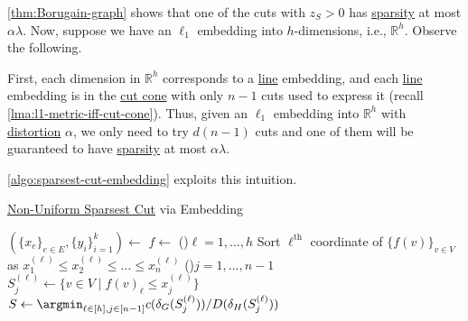 \autoref{thm:Borugain-graph} shows that one of the cuts with \(z_S > 0\) has \hyperref[def:sparsity]{sparsity} at most \(\alpha \lambda \). Now, suppose we have an \hyperref[def:l1-metric]{\(\ell _1\)} embedding into \(h\)-dimensions, i.e., \(\mathbb{R} ^h\). Observe the following.

\begin{intuition}
	First, each dimension in \(\mathbb{R} ^h\) corresponds to a \hyperref[def:line-metric]{line} embedding, and each \hyperref[def:line-metric]{line} embedding is in the \hyperref[def:cut-cone]{cut cone} with only \(n-1\) cuts used to express it (recall \autoref{lma:l1-metric-iff-cut-cone}). Thus, given an \hyperref[def:l1-metric]{\(\ell _1\)} embedding into \(\mathbb{R} ^h\) with \hyperref[def:distortion]{distortion} \(\alpha \), we only need to try \(d(n-1)\) cuts and one of them will be guaranteed to have \hyperref[def:sparsity]{sparsity} at most \(\alpha \lambda \).
\end{intuition}

\autoref{algo:sparsest-cut-embedding} exploits this intuition.

\begin{algorithm}[H]\label{algo:sparsest-cut-embedding}
	\DontPrintSemicolon{}
	\caption{\hyperref[prb:non-uniform-sparsest-cut]{Non-Uniform Sparsest Cut} via Embedding}

	\BlankLine
	\((\{ x_e \} _{e\in E} , \{ y_i \}_{i=1}^{k} )\gets\)\;
	\(f \gets\)
	\For(){\(\ell = 1, \dots , h\)}{
	Sort \(\ell ^{\text{th} }\) coordinate of \(\{f(v)\}_{v \in V}\) as \(x_1^{(\ell )} \leq x_2^{(\ell )} \leq \dots \leq x_n^{(\ell )}\)
	\For(){\(j = 1, \dots , n-1\)}{
	\(S_j^{(\ell )} \gets \{ v \in V \mid f(v)_{\ell } \leq x_j^{(\ell )} \} \)\;
	}
	}
	\(S \gets \argmin_{\ell \in [h], j \in [n-1]} c(\delta _G(S_j^{(\ell )})) / D(\delta _H(S_j^{(\ell )}))\)\;
	\;
\end{algorithm}

